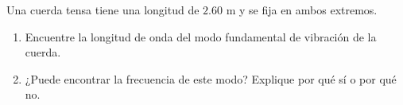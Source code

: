 \item Una cuerda tensa tiene una longitud de $2.60\text{ m}$ y se fija en ambos extremos.
\begin{enumerate}
    \item Encuentre la longitud de onda del modo fundamental de vibración de la cuerda.
    \item ¿Puede encontrar la frecuencia de este modo? Explique por qué sí o por qué no.
\end{enumerate}
